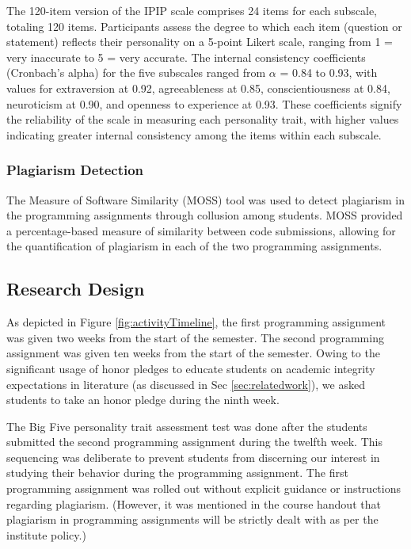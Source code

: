 The 120-item version of the IPIP scale comprises 24 items for each subscale, totaling 120 items. Participants assess the degree to which each item (question or statement) reflects their personality on a 5-point Likert scale, ranging from 1 = very inaccurate to 5 = very accurate. The internal consistency coefficients (Cronbach's alpha) for the five subscales ranged from \begin{math} \alpha \end{math} = 0.84 to 0.93, with values for extraversion at 0.92, agreeableness at 0.85, conscientiousness at 0.84, neuroticism at 0.90, and openness to experience at 0.93. These coefficients signify the reliability of the scale in measuring each personality trait, with higher values indicating greater internal consistency among the items within each subscale.

\subsubsection{Plagiarism Detection}

The Measure of Software Similarity (MOSS) tool \cite{MOSS} was used to detect plagiarism in the programming assignments through collusion among students. MOSS provided a percentage-based measure of similarity between code submissions, allowing for the quantification of plagiarism in each of the two programming assignments.

\subsection{Research Design}

As depicted in Figure \ref{fig:activityTimeline}, the first programming assignment was given two weeks from the start of the semester. The second programming assignment was given ten weeks from the start of the semester. Owing to the significant usage of honor pledges to educate students on academic integrity expectations in literature (as discussed in Sec \ref{sec:relatedwork}), we asked students to take an honor pledge during the ninth week.

The Big Five personality trait assessment test was done after the students submitted the second programming assignment during the twelfth week. This sequencing was deliberate to prevent students from discerning our interest in studying their behavior during the programming assignment. The first programming assignment was rolled out without explicit guidance or instructions regarding plagiarism. (However, it was mentioned in the course handout that plagiarism in programming assignments will be strictly dealt with as per the institute policy.)

